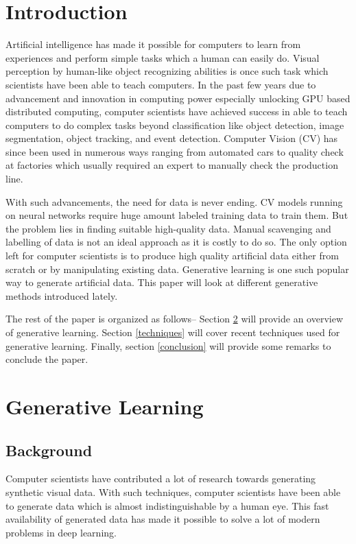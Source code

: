 \documentclass[conference]{IEEEtran}
\begin{document}
\section{Introduction}
Artificial intelligence has made it possible for computers to learn from experiences and perform simple tasks which a human can easily do. Visual perception by human-like object recognizing abilities is once such task which scientists have been able to teach computers. In the past few years due to advancement and innovation in computing power especially unlocking GPU based distributed computing, computer scientists have achieved success in able to teach computers to do complex tasks beyond classification like object detection, image segmentation, object tracking, and event detection. Computer Vision (CV) has since been used in numerous ways ranging from automated cars to quality check at factories which usually required an expert to manually check the production line.

With such advancements, the need for data is never ending. CV models running on neural networks require huge amount labeled training data to train them. But the problem lies in finding suitable high-quality data. Manual scavenging and labelling of data is not an ideal approach as it is costly to do so. The only option left for computer scientists is to produce high quality artificial data either from scratch or by manipulating existing data. Generative learning is one such popular way to generate artificial data. This paper will look at different generative methods introduced lately.

The rest of the paper is organized as follows-- Section \ref{lr} will provide an overview of generative learning. Section \ref{techniques} will cover recent techniques used for generative learning. Finally, section \ref{conclusion} will provide some remarks to conclude the paper. 

\section{Generative Learning}
\label{lr}
\subsection{Background}
Computer scientists have contributed a lot of research towards generating synthetic visual data. With such techniques, computer scientists have been able to generate data which is almost indistinguishable by a human eye. This fast availability of generated data has made it possible to solve a lot of modern problems in deep learning.
\end{document}
